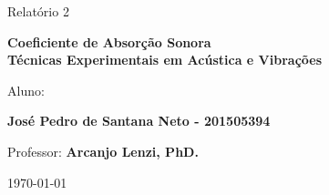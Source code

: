 {\begin{capa}
\begin{figure}[!ht]
\begin{minipage}[c]{0.78\textwidth}
\begin{minipage}[t]{1\linewidth}
		\vspace{2cm}
		\Huge Relatório 2
		
	
		\vspace{1cm}
		 \textbf{Coeficiente de Absorção Sonora\\
		 	\Large{Técnicas Experimentais em Acústica e Vibrações}}
		
		\vspace{6cm}
		
		\large
		Aluno:
		
		\textbf{José Pedro de Santana Neto - 201505394}\\
		
		\vspace{6cm}
		
		
		\large
		Professor:
		\textbf{Arcanjo Lenzi, PhD.}
		
		
		\vspace{3cm}
		\vfill
		
		\today 
  \end{minipage}
\end{minipage}
\end{figure}	
	
\end{capa}

\restoregeometry








}
